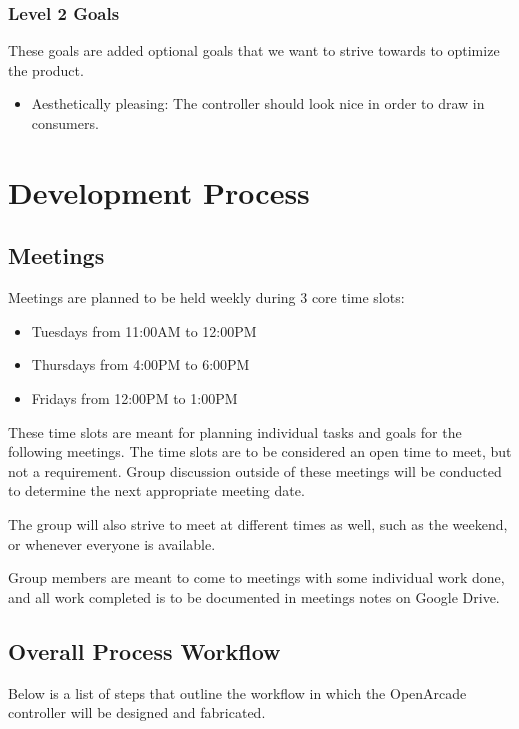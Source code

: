 \documentclass[a4]{article}
\begin{document}
\subsubsection{Level 2 Goals}
These goals are added optional goals that we want to strive towards to optimize the product.
\begin{itemize}
	\item \textcolor{McMasterMaroon}{Aesthetically pleasing}: The controller should look nice in order to draw in consumers.
\end{itemize}
\clearpage
\section{Development Process}
\subsection{Meetings}
Meetings are planned to be held weekly during 3 core time slots:
\begin{itemize}
	\item Tuesdays from \textcolor{McMasterMaroon}{11:00AM to 12:00PM}
	\item Thursdays from \textcolor{McMasterMaroon}{4:00PM to 6:00PM}
	\item Fridays from \textcolor{McMasterMaroon}{12:00PM to 1:00PM}
\end{itemize}
These time slots are meant for planning individual tasks and goals for the following meetings. The time slots are to be considered an open time to meet, but not a requirement. Group discussion outside of these meetings will be conducted to determine the next appropriate meeting date.

The group will also strive to meet at different times as well, such as the weekend, or whenever everyone is available.

Group members are meant to come to meetings with some individual work done, and all work completed is to be documented in meetings notes on Google Drive.
\subsection{Overall Process Workflow}
Below is a list of steps that outline the workflow in which the OpenArcade controller will be designed and fabricated.
\end{document}

